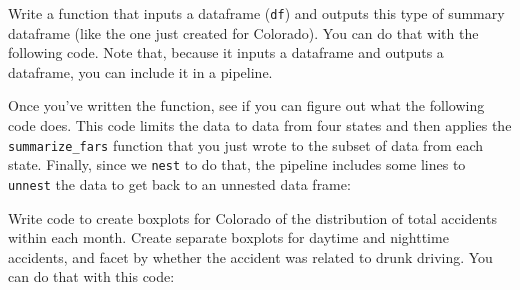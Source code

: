 \documentclass[]{book}
\makeatletter
\newenvironment{Shaded}{\begin{snugshade}}{\end{snugshade}}
\newcommand{\KeywordTok}[1]{\textcolor[rgb]{0.13,0.29,0.53}{\textbf{#1}}}
\newcommand{\DataTypeTok}[1]{\textcolor[rgb]{0.13,0.29,0.53}{#1}}
\newcommand{\StringTok}[1]{\textcolor[rgb]{0.31,0.60,0.02}{#1}}
\newcommand{\ControlFlowTok}[1]{\textcolor[rgb]{0.13,0.29,0.53}{\textbf{#1}}}
\newcommand{\OperatorTok}[1]{\textcolor[rgb]{0.81,0.36,0.00}{\textbf{#1}}}
\newcommand{\NormalTok}[1]{#1}
\newenvironment{kframe}{%
\medskip{}
\setlength{\fboxsep}{.8em}
 \def\at@end@of@kframe{}%
 \ifinner\ifhmode%
  \def\at@end@of@kframe{\end{minipage}}%
  \begin{minipage}{\columnwidth}%
 \fi\fi%
 \def\FrameCommand##1{\hskip\@totalleftmargin \hskip-\fboxsep
 \colorbox{shadecolor}{##1}\hskip-\fboxsep
     \hskip-\linewidth \hskip-\@totalleftmargin \hskip\columnwidth}%
 \MakeFramed {\advance\hsize-\width
   \@totalleftmargin\z@ \linewidth\hsize
   \@setminipage}}%
 {\par\unskip\endMakeFramed%
 \at@end@of@kframe}
\renewenvironment{Shaded}{\begin{kframe}}{\end{kframe}}
\theoremstyle{definition}
\theoremstyle{definition}
\theoremstyle{definition}
\theoremstyle{remark}
\makeatother
\begin{document}
Write a function that inputs a dataframe (\texttt{df}) and outputs this
type of summary dataframe (like the one just created for Colorado). You
can do that with the following code. Note that, because it inputs a
dataframe and outputs a dataframe, you can include it in a pipeline.

\begin{Shaded}
\end{Shaded}

Once you've written the function, see if you can figure out what the
following code does. This code limits the data to data from four states
and then applies the \texttt{summarize\_fars} function that you just
wrote to the subset of data from each state. Finally, since we
\texttt{nest} to do that, the pipeline includes some lines to
\texttt{unnest} the data to get back to an unnested data frame:

\begin{Shaded}
\end{Shaded}

Write code to create boxplots for Colorado of the distribution of total
accidents within each month. Create separate boxplots for daytime and
nighttime accidents, and facet by whether the accident was related to
drunk driving. You can do that with this code:
\end{document}
